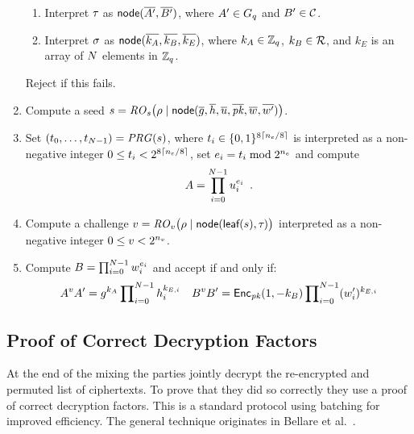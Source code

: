 \documentclass[11pt]{article}
\begin{document}
\begin{nicebox}
\begin{algorithm}
\begin{enumerate}
\begin{enumerate}
    \item Interpret $\tau_{}$ as $\textsf{node}(\overline{A'},\overline{B'})$, where
      $A'\in G_{q}$ and $B'\in\mathcal{C}$.

    \item Interpret $\sigma_{}$ as
      $\textsf{node}(\overline{k_A},\overline{k_B},\overline{k_E})$, where $k_A\in\mathbb{Z}_{q}$,
      $k_B\in\mathcal{R}$, and $k_E$ is an array of $N$ elements in
      $\mathbb{Z}_{q}$.

    \end{enumerate}
    Reject if this fails.

  \item Compute a seed
    $s=\mathit{RO}_s\big(\rho\mid\textsf{node}(\overline{g},\overline{h},\overline{u},\overline{\mathit{pk}},\overline{w_{}},\overline{w_{}'})\big)$.

  \item Set $(t_0,\ldots,t_{N-1})=\mathit{PRG}(s)$, where
    $t_i\in\{0,1\}^{8\lceil{n_e}/8\rceil}$ is interpreted as a
    non-negative integer $0\leq t_i<2^{8\lceil{n_e}/8\rceil}$, set $e_i=t_i\bmod 2^{{n_e}}$ and compute
    \begin{align*}
      A=\prod_{i=0}^{N-1}u_{i}^{e_i}\enspace.
    \end{align*}

  \item Compute a challenge
    $v=\mathit{RO}_v\big(\rho\mid\textsf{node}(\textsf{leaf}(s),\tau_{})\big)$ interpreted as a
    non-negative integer $0\leq v<2^{n_v}$.

  \item Compute $B=\prod\nolimits_{i=0}^{N-1}w_{i}^{e_i}$ and accept if
    and only if:
    \begin{align*}
      A^vA'&=g^{k_A}\prod\nolimits_{i=0}^{N-1}h_{i}^{k_{E,i}}
      &B^vB'&=\textsf{Enc}_{\mathit{pk}}(1,-k_{B})\prod\nolimits_{i=0}^{N-1}(w_{i}')^{k_{E,i}}\\
    \end{align*}

  \end{enumerate}
\end{algorithm}
\end{nicebox}


\subsection{Proof of Correct Decryption Factors}

At the end of the mixing the parties jointly decrypt the re-encrypted
and permuted list of ciphertexts. To prove that they did so correctly
they use a proof of correct decryption factors. This is a standard
protocol using batching for improved efficiency. The general technique
originates in Bellare et al.~\cite{BeGaRa}.
\end{document}
